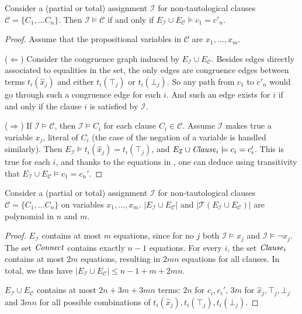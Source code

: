 \documentclass[smallextended]{svjour3}
\begin{document}
\begin{lemma}
\label{lemma:eqv}
Consider a (partial or total) assignment $\mathcal{I}$ for non-tautological
clauses $\mathcal{C}= \{C_1, \dots C_n\}$.  Then $\mathcal{I} \models
\mathcal{C}$ if and only if $E_{\mathcal{I}} \cup E_\mathcal{C} \models c_1 =
c'_n$.
\end{lemma}
\begin{proof}

Assume that the propositional variables in $\mathcal{C}$ are $x_1,\ldots, x_m$.

($\Leftarrow$)  Consider the congruence graph induced by
$E_{\mathcal{I}} \cup E_\mathcal{C}$.  Besides edges directly associated to
equalities in the set, the only edges are congruence edges between terms
$t_i(\hat{x}_j)$ and either $t_i(\top_j)$ or $t_i(\bot_j)$.  So any path from
$c_1$ to $c'_n$ would go through such a congruence edge for each $i$.
And such an edge exists for $i$ if and only if the clause $i$ is satisfied by
$\mathcal{I}$.

($\Rightarrow$)  If $\mathcal{I} \models \mathcal{C}$, then
$\mathcal{I} \models C_i$ for each clause $C_i \in \mathcal{C}$.  Assume
$\mathcal{I}$ makes true a variable $x_j$, literal of $C_i$ (the case of
the negation of a variable is handled similarly).  Then $E_{\mathcal{I}} \models
t_i(\hat{x}_j) = t_i(\top_j)$, and $E_{\mathcal{I}} \cup {\it Clause}_i
\models c_i = c_i'$.  This is true for each $i$, and
thanks to the equations in \Connect, one can deduce using transitivity that
$E_{\mathcal{I}} \cup E_\mathcal{C} \models c_1 = c_n'$.

\end{proof}

\begin{lemma}
Consider a (partial or total) assignment $\mathcal{I}$ for 
non-tautological clauses $\mathcal{C}= \{C_1, \dots C_n\}$ on variables  $x_1,\ldots, x_m$. $|E_{\mathcal{I}} \cup E_\mathcal{C}|$ and
$|\mathcal{T}(E_{\mathcal{I}} \cup E_\mathcal{C})|$ are polynomial in $n$ and
$m$.
\end{lemma}

\begin{proof}
$E_{\mathcal{I}}$ contains at most $m$ equations, since for no $j$ both $\mathcal{I} \models x_j$ and $\mathcal{I} \models \neg x_j$.
The set ${\it Connect}$ contains exactly $n-1$ equations.
For every $i$, the set ${\it Clause}_i$ contains at most $2m$ equations, resulting in $2mn$ equations for all clauses.
In total, we thus have $|E_{\mathcal{I}} \cup E_\mathcal{C}| \leq n-1 + m + 2mn$.

$E_{\mathcal{I}} \cup E_\mathcal{C}$ contains at most $2n + 3m + 3mn$ terms: $2n$ for $c_i,c_i'$, $3m$ for $\hat{x}_j,\top_j,\bot_j$ and $3mn$ for all possible combinations of $t_i(\hat{x}_j),t_i(\top_j),t_i(\bot_j)$.
\end{proof}
\end{document}
